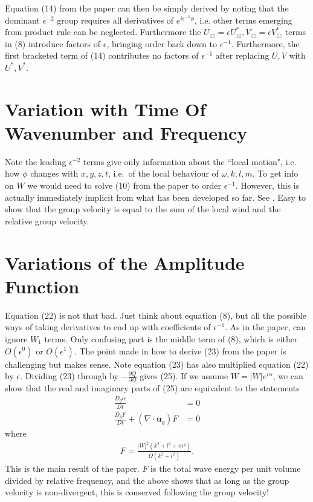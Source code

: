 \documentclass[12pt]{article}
\begin{document}
Equation (14) from the paper can then be simply derived by noting that the dominant $\epsilon^{-2}$ group requires all derivatives of $e^{ i \epsilon^{-1} \phi}$, i.e. other terms emerging from product rule can be neglected. Furthermore the $U_{zz} = \epsilon U^*_{zz}, V_{zz} = \epsilon V^*_{zz}$ terms in (8) introduce factors of $\epsilon$, bringing order back down to $\epsilon^{-1}$. Furthermore, the first bracketed term of (14) contributes no factors of $\epsilon^{-1}$ after replacing $U,V$ with $U^*, V^*$. 

\section{Variation with Time Of Wavenumber and Frequency}

Note the leading $\epsilon^{-2}$ terms give only information about the ``local motion", i.e. how $\phi$ changes with $x,y,z,t$, i.e.~of the local behaviour of $\omega,k,l,m$. To get info on $W$ we would need to solve (10) from the paper to order $\epsilon^{-1}$. However, this is actually immediately implicit from what has been developed so far. See \citet[p. 471]{bretherton66}. Easy to show that the group velocity is equal to the sum of the local wind and the relative group velocity. 

\section{Variations of the Amplitude Function}
Equation (22) is not that bad. Just think about equation (8), but all the possible ways of taking derivatives to end up with coefficients of $\epsilon^{-1}$. As in the paper, can ignore $W_1$ terms. Only confusing part is the middle term of (8), which is either $O(\epsilon^{0})$ or $O(\epsilon^{1})$. The point made in how to derive (23) from the paper is challenging but makes sense. Note equation (23) has also multiplied equation (22) by $\epsilon$. Dividing (23) through by $-\frac{\partial Q}{\partial \Omega}$ gives (25). If we assume $W=|W|e^{i\alpha}$, we can show that the real and imaginary parts of (25) are equivalent to the statements
\begin{align*}
\frac{D_g \alpha}{Dt} &= 0 \\
\frac{D_g F}{Dt} + (\nabla\cdot \boldsymbol{u}_g)F &= 0
\end{align*}  
where 
\begin{align*}
F = \frac{|W|^2 (k^2+l^2+m^2)}{\Omega (k^2+l^2)}.
\end{align*}
This is the main result of the paper. $F$ is the total wave energy per unit volume divided by relative frequency, and the above shows that as long as the group velocity is non-divergent, this is conserved following the group velocity!
\end{document}
